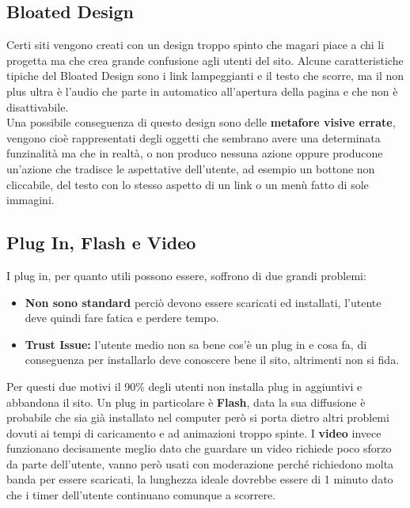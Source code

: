 \subsection{Bloated Design}
Certi siti vengono creati con un design troppo spinto che magari piace a chi li progetta ma che crea grande confusione agli utenti del sito.
Alcune caratteristiche tipiche del Bloated Design sono i link lampeggianti e il testo che scorre, ma il non plus ultra è l'audio che parte in automatico all'apertura della pagina e che non è disattivabile.\\
Una possibile conseguenza di questo design sono delle \textbf{metafore visive errate}, vengono cioè rappresentati degli oggetti che sembrano avere una determinata funzinalità ma che in realtà, o non produco nessuna azione oppure producone un'azione che tradisce le aspettative dell'utente, ad esempio un bottone non cliccabile, del testo con lo stesso aspetto di un link o un menù fatto di sole immagini.

\subsection{Plug In, Flash e Video}
I plug in, per quanto utili possono essere, soffrono di due grandi problemi:
\begin{itemize}
\item \textbf{Non sono standard} perciò devono essere scaricati ed installati, l'utente deve quindi fare fatica e perdere tempo.
\item \textbf{Trust Issue:} l'utente medio non sa bene cos'è un plug in e cosa fa, di conseguenza per installarlo deve conoscere bene il sito, altrimenti non si fida.
\end{itemize}
Per questi due motivi il 90\% degli utenti non installa plug in aggiuntivi e abbandona il sito.
Un plug in particolare è \textbf{Flash}, data la sua diffusione è probabile che sia già installato nel computer però si porta dietro altri problemi dovuti ai tempi di caricamento e ad animazioni troppo spinte.
I \textbf{video} invece funzionano decisamente meglio dato che guardare un video richiede poco sforzo da parte dell'utente, vanno però usati con moderazione perché richiedono molta banda per essere scaricati, la lunghezza ideale dovrebbe essere di 1 minuto dato che i timer dell'utente continuano comunque a scorrere.

